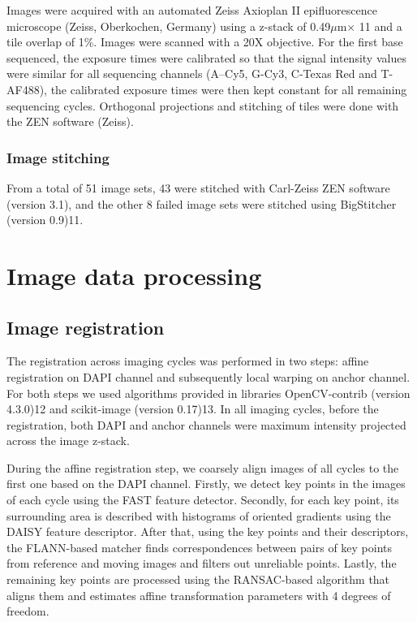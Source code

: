 Images were acquired with an automated Zeiss Axioplan II epifluorescence microscope (Zeiss, Oberkochen, Germany) using a z-stack of 0.49$\mu$m$ \times$ 11 and a tile overlap of 1\%. Images were scanned with a 20X objective. For the first base sequenced, the exposure times were calibrated so that the signal intensity values were similar for all sequencing channels (A–Cy5, G-Cy3, C-Texas Red and T-AF488), the calibrated exposure times were then kept constant for all remaining sequencing cycles. Orthogonal projections and stitching of tiles were done with the ZEN software (Zeiss).

\subsubsection*{Image stitching}

From a total of 51 image sets, 43 were stitched with Carl-Zeiss ZEN software (version 3.1), and the other 8 failed image sets were stitched using BigStitcher (version 0.9)11.

\section{Image data processing}
\label{sec:protocol-suppl-image-processing}

\subsection{Image registration}

The registration across imaging cycles was performed in two steps: affine registration on DAPI channel and subsequently local warping on anchor channel. For both steps we used algorithms provided in libraries OpenCV-contrib (version 4.3.0)12 and scikit-image (version 0.17)13. In all imaging cycles, before the registration, both DAPI and anchor channels were maximum intensity projected across the image z-stack.

During the affine registration step, we coarsely align images of all cycles to the first one based on the DAPI channel. Firstly, we detect key points in the images of each cycle using the FAST feature detector. Secondly, for each key point, its surrounding area is described with histograms of oriented gradients using the DAISY feature descriptor. After that, using the key points and their descriptors, the FLANN-based matcher finds correspondences between pairs of key points from reference and moving images and filters out unreliable points. Lastly, the remaining key points are processed using the RANSAC-based algorithm that aligns them and estimates affine transformation parameters with 4 degrees of freedom.

